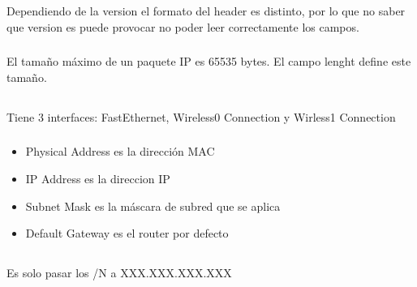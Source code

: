 \section{}

\setcounter{subsection}{1}
\subsection{}
\subsubsection{}
Dependiendo de la version el formato del header es distinto, por lo que no saber que version es puede provocar no poder leer correctamente los campos.

\setcounter{subsubsection}{2}
\subsubsection{}
El tamaño máximo de un paquete IP es 65535 bytes. El campo lenght define este tamaño.

\subsection{}
\subsubsection{}
Tiene 3 interfaces: FastEthernet, Wireless0 Connection y Wirless1 Connection

\subsubsection{}
\begin{itemize}
\item Physical Address es la dirección MAC
\item IP Address es la direccion IP
\item Subnet Mask es la máscara de subred que se aplica
\item Default Gateway es el router por defecto
\end{itemize}

\subsection{}
\subsubsection{}
Es solo pasar los /N a XXX.XXX.XXX.XXX

